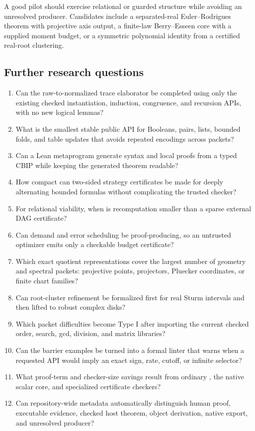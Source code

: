 A good pilot should exercise relational or guarded structure while avoiding an unresolved producer.  Candidates include a separated-real Euler--Rodrigues theorem with projective axis output, a finite-law Berry--Esseen core with a supplied moment budget, or a symmetric polynomial identity from a certified real-root clustering.

\subsection{Further research questions}

\begin{enumerate}
\item Can the raw-to-normalized trace elaborator be completed using only the existing checked instantiation, induction, congruence, and recursion APIs, with no new logical lemmas?
\item What is the smallest stable public API for Booleans, pairs, lists, bounded folds, and table updates that avoids repeated encodings across packets?
\item Can a Lean metaprogram generate  syntax and  local proofs from a typed CBIP while keeping the generated theorem readable?
\item How compact can two-sided strategy certificates be made for deeply alternating bounded formulas without complicating the trusted checker?
\item For relational viability, when is recomputation smaller than a sparse external DAG certificate?
\item Can demand and error scheduling be proof-producing, so an untrusted optimizer emits only a checkable budget certificate?
\item Which exact quotient representations cover the largest number of geometry and spectral packets: projective points, projectors, Pluecker coordinates, or finite chart families?
\item Can root-cluster refinement be formalized first for real Sturm intervals and then lifted to robust complex disks?
\item Which packet difficulties become Type I after importing the current checked order, search, gcd, division, and matrix libraries?
\item Can the barrier examples be turned into a formal linter that warns when a requested API would imply an exact sign, rate, cutoff, or infinite selector?
\item What proof-term and checker-size savings result from ordinary , the native scalar core, and specialized certificate checkers?
\item Can repository-wide metadata automatically distinguish human proof, executable evidence, checked host theorem, object derivation, native export, and unresolved producer?
\end{enumerate}

